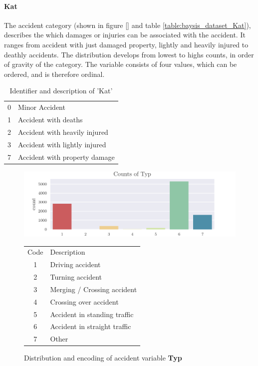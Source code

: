 \paragraph{Kat}
The accident category (shown in figure \autoref{} and table \autoref{table:baysis_dataset_Kat}), describes the which damages or injuries can be associated with the accident. It ranges from accident with just  damaged property, lightly and heavily injured to deathly accidents. The distribution develops from lowest to highs counts, in order of gravity of the category. The variable consists of four values, which can be ordered, and is therefore ordinal.
\noindent
\begin{table}[ht]
	\centering
	\begin{tabular}{c|l}  
 		0 & Minor Accident  \\
 		1 & Accident with deaths  \\ 
 		2 & Accident with heavily injured  \\
 		3 & Accident with lightly injured  \\
 		7 & Accident with property damage  \\
	\end{tabular}
	\caption{Identifier and description of 'Kat'}
	\label{table:baysis_dataset_Kat}
\end{table}

\begin{figure}[ht]
    \centering
	\includegraphics[scale=1.0]{CorrAnalysis/data/BAYSIS/01_dataset/plots/baysis_dataset_count_Typ}
	\qquad
	\small
    \begin{tabular}[b]{c|l}
      Code & Description \\
	  1 & Driving accident  \\ 
	  2 & Turning accident  \\
	  3 & Merging / Crossing accident  \\
	  4 & Crossing over accident  \\
	  5 & Accident in standing traffic  \\
	  6 & Accident in straight traffic  \\
	  7 & Other  \\
	\end{tabular}
    \captionsetup{labelformat=andtable}
	\caption{Distribution and encoding of accident variable \textbf{Typ}}
\end{figure}

